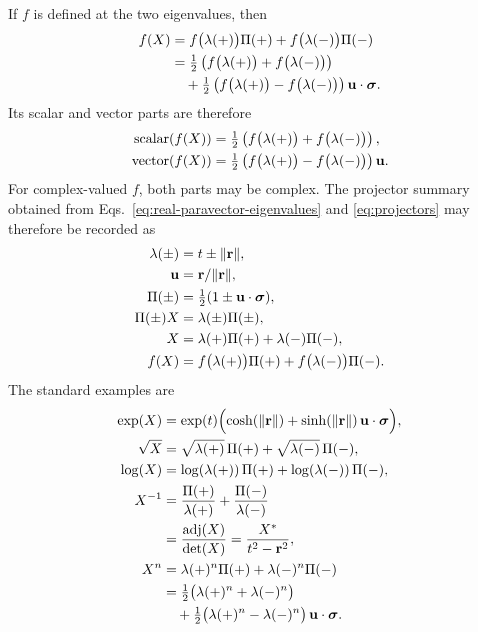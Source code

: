 If \(f\) is defined at the two eigenvalues, then
\begin{align*}
f(X)
&=f\bigl(\lambda(+)\bigr)\Pi(+)
+f\bigl(\lambda(-)\bigr)\Pi(-)\notag\\
&=\tfrac12\left(
f\bigl(\lambda(+)\bigr)+f\bigl(\lambda(-)\bigr)\right)\notag\\
&\quad+\tfrac12\left(
f\bigl(\lambda(+)\bigr)-f\bigl(\lambda(-)\bigr)\right)
\mathbf{u}\cdot\mathbf{\bm{\sigma}}.
\end{align*}
Its scalar and vector parts are therefore
\begin{align*}
\operatorname{scalar}(f(X))
&=\tfrac12\left(
f\bigl(\lambda(+)\bigr)+f\bigl(\lambda(-)\bigr)\right),\\
\operatorname{vector}(f(X))
&=\tfrac12\left(
f\bigl(\lambda(+)\bigr)-f\bigl(\lambda(-)\bigr)\right)\mathbf{u}.
\end{align*}
For complex-valued \(f\), both parts may be complex.
The projector summary obtained from
Eqs.\ \eqref{eq:real-paravector-eigenvalues} and \eqref{eq:projectors} may
therefore be recorded as
\begin{align*}
\lambda(\pm)&=t\pm\lVert\mathbf{r}\rVert,\notag\\
\mathbf{u}&=\mathbf{r}/\lVert\mathbf{r}\rVert,\notag\\
\Pi(\pm)&=\tfrac12(1\pm\mathbf{u}\cdot\mathbf{\bm{\sigma}}),\notag\\
\Pi(\pm)X&=\lambda(\pm)\Pi(\pm),\notag\\
X&=\lambda(+)\Pi(+)+\lambda(-)\Pi(-),\notag\\
f(X)&=f\bigl(\lambda(+)\bigr)\Pi(+)+f\bigl(\lambda(-)\bigr)\Pi(-).
\end{align*}
The standard examples are
\begin{align*}
\exp(X)
&= \exp(t)\Bigl(\cosh(\lVert\mathbf{r}\rVert)+\sinh(\lVert\mathbf{r}\rVert)\,\mathbf{u}\cdot\mathbf{\bm{\sigma}}\Bigr), \\
\sqrt{X}
&= \sqrt{\lambda(+)}\,\Pi(+)
+\sqrt{\lambda(-)}\,\Pi(-), \\
\log(X)
&= \log(\lambda(+))\,\Pi(+)
+\log(\lambda(-))\,\Pi(-), \\
X^{-1}
&= \frac{\Pi(+)}{\lambda(+)}
+ \frac{\Pi(-)}{\lambda(-)}\notag \\
&= \frac{\operatorname{adj}\!\left(X\right)}{\operatorname{det}\!\left(X\right)}
= \frac{X^{*}}{t^{2}-\mathbf{r}^{2}}, \\
X^{n}
&= \lambda(+)^{n}\Pi(+)
+\lambda(-)^{n}\Pi(-)\notag \\
&= \tfrac12\bigl(\lambda(+)^{n}+\lambda(-)^{n}\bigr)\notag\\
&\quad+\tfrac12\bigl(\lambda(+)^{n}-\lambda(-)^{n}\bigr)
\,\mathbf{u}\cdot\mathbf{\bm{\sigma}}.
\end{align*}
